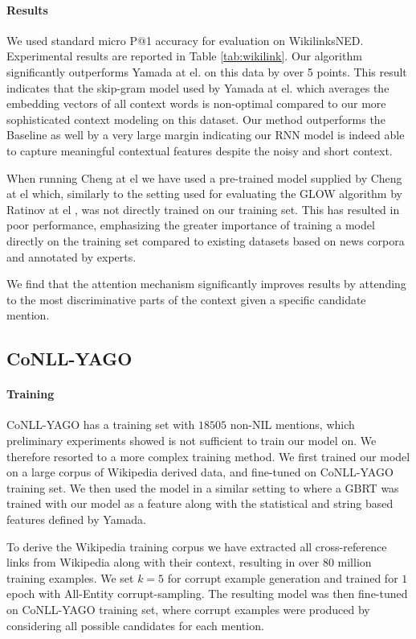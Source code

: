\documentclass[11pt]{article}
\begin{document}
\paragraph{Results}
We used standard micro P@1 accuracy for evaluation on WikilinksNED. Experimental results are reported in Table \ref{tab:wikilink}. Our algorithm significantly outperforms Yamada at el. on this data by over 5 points. This result indicates that the skip-gram model used by Yamada at el. which averages the embedding vectors of all context words is non-optimal compared to our more sophisticated context modeling on this dataset. Our method outperforms the Baseline as well by a very large margin indicating our RNN model is indeed able to capture meaningful contextual features despite the noisy and short context. 

When running Cheng at el  we have used a pre-trained model supplied by Cheng at el which, similarly to the setting used for evaluating the GLOW algorithm by Ratinov at el \cite{ratinov2011glow}, was not directly trained on our training set. This has resulted in poor performance, emphasizing the greater importance of training a model directly on the training set compared to existing datasets based on news corpora and annotated by experts.

We find that the attention mechanism significantly improves results by attending to the most discriminative parts of the context given a specific candidate mention.

\subsection{CoNLL-YAGO}
\label{experiments-conll}

\paragraph{Training}
CoNLL-YAGO has a training set with $18505$ non-NIL mentions, which preliminary experiments showed is not sufficient to train our model on. We therefore resorted to a more complex training method. We first trained our model on a large corpus of Wikipedia derived data, and fine-tuned on CoNLL-YAGO training set. We then used the model in a similar setting to  where a GBRT was trained with our model as a feature along with the statistical and string based features defined by Yamada. 

To derive the Wikipedia training corpus we have extracted all cross-reference links from Wikipedia along with their context, resulting in over $80$ million training examples. We set $k=5$ for corrupt example generation and trained for $1$ epoch with All-Entity corrupt-sampling. The resulting model was then fine-tuned on CoNLL-YAGO training set, where corrupt examples were produced by considering all possible candidates for each mention.
\end{document}
